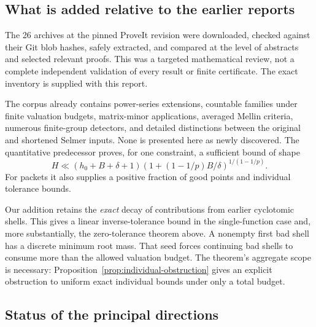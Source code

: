 \subsection{What is added relative to the earlier reports}

The 26 archives at the pinned ProveIt revision were downloaded, checked
against their Git blob hashes, safely extracted, and compared at the level
of abstracts and selected relevant proofs. This was a targeted mathematical
review, not a complete independent validation of every result or finite
certificate. The exact inventory is supplied with this report.

The corpus already contains power-series extensions, countable families
under finite valuation budgets, matrix-minor applications, averaged
Mellin criteria, numerous finite-group detectors, and detailed distinctions
between the original and shortened Selmer inputs. None is presented here
as newly discovered. The quantitative predecessor
\cite{priorquant} proves, for one constraint, a sufficient bound of shape
\[
 H\ll (h_0+B+\delta+1)
       \left(1+(1-1/p)B/\delta\right)^{1/(1-1/p)}.
\]
For packets it also supplies a positive fraction of good points and
individual tolerance bounds.

Our addition retains the \emph{exact} decay of contributions from earlier
cyclotomic shells. This gives a linear inverse-tolerance bound in the
single-function case and, more substantially, the zero-tolerance theorem
above. A nonempty first bad shell has a discrete minimum root mass.
That seed forces continuing bad shells to consume more than the allowed
valuation budget. The theorem's aggregate scope is necessary:
Proposition~\ref{prop:individual-obstruction} gives an explicit obstruction
to uniform exact individual bounds under only a total budget.

\subsection{Status of the principal directions}

